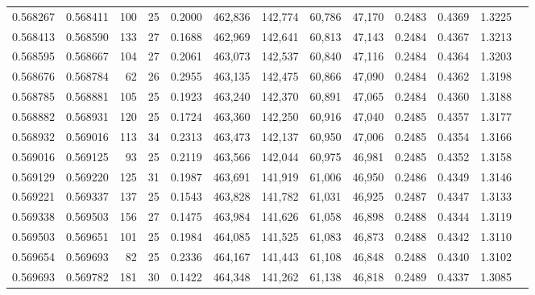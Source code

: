 \begin{tabular}{rrrrrrrrrrrrr}
0.568267 & 0.568411 & 100 &  25 &                                     0.2000 & 462,836 & 142,774 &  60,786 &  47,170 & 0.2483 & 0.4369 & 1.3225 \\
0.568413 & 0.568590 & 133 &  27 &                                     0.1688 & 462,969 & 142,641 &  60,813 &  47,143 & 0.2484 & 0.4367 & 1.3213 \\
0.568595 & 0.568667 & 104 &  27 &                                     0.2061 & 463,073 & 142,537 &  60,840 &  47,116 & 0.2484 & 0.4364 & 1.3203 \\
0.568676 & 0.568784 &  62 &  26 &                                     0.2955 & 463,135 & 142,475 &  60,866 &  47,090 & 0.2484 & 0.4362 & 1.3198 \\
0.568785 & 0.568881 & 105 &  25 &                                     0.1923 & 463,240 & 142,370 &  60,891 &  47,065 & 0.2484 & 0.4360 & 1.3188 \\
0.568882 & 0.568931 & 120 &  25 &                                     0.1724 & 463,360 & 142,250 &  60,916 &  47,040 & 0.2485 & 0.4357 & 1.3177 \\
0.568932 & 0.569016 & 113 &  34 &                                     0.2313 & 463,473 & 142,137 &  60,950 &  47,006 & 0.2485 & 0.4354 & 1.3166 \\
0.569016 & 0.569125 &  93 &  25 &                                     0.2119 & 463,566 & 142,044 &  60,975 &  46,981 & 0.2485 & 0.4352 & 1.3158 \\
0.569129 & 0.569220 & 125 &  31 &                                     0.1987 & 463,691 & 141,919 &  61,006 &  46,950 & 0.2486 & 0.4349 & 1.3146 \\
0.569221 & 0.569337 & 137 &  25 &                                     0.1543 & 463,828 & 141,782 &  61,031 &  46,925 & 0.2487 & 0.4347 & 1.3133 \\
0.569338 & 0.569503 & 156 &  27 &                                     0.1475 & 463,984 & 141,626 &  61,058 &  46,898 & 0.2488 & 0.4344 & 1.3119 \\
0.569503 & 0.569651 & 101 &  25 &                                     0.1984 & 464,085 & 141,525 &  61,083 &  46,873 & 0.2488 & 0.4342 & 1.3110 \\
0.569654 & 0.569693 &  82 &  25 &                                     0.2336 & 464,167 & 141,443 &  61,108 &  46,848 & 0.2488 & 0.4340 & 1.3102 \\
0.569693 & 0.569782 & 181 &  30 &                                     0.1422 & 464,348 & 141,262 &  61,138 &  46,818 & 0.2489 & 0.4337 & 1.3085 \\

\end{tabular}
